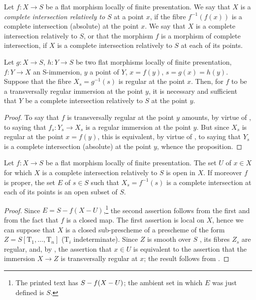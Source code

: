 \begin{definition}[19.3.6]
\label{IV.19.3.6}
Let $f:X\to S$ be a \textup{flat} morphism locally of finite presentation.
We say that $X$ is a \emph{complete intersection relatively to $S$} at a point $x$, if the fibre $f^{-1}(f(x))$ is a complete intersection (absolute) at the point $x$.
We say that $X$ is a complete intersection relatively to $S$, or that the morphism $f$ is a morphism of complete intersection, if $X$ is a complete intersection relatively to $S$ at each of its points.
\end{definition}

\begin{proposition}[19.3.7]
\label{IV.19.3.7}
Let $g:X\to S$, $h:Y\to S$ be two flat morphisms locally of finite presentation, $f:Y\to X$ an S-immersion, $y$ a point of $Y$, $x=f(y)$, $s=g(x)=h(y)$.
Suppose that the fibre $X_s=g^{-1}(s)$ is regular at the point $x$.
Then, for $f$ to be a transversally regular immersion at the point $y$, it is necessary and sufficient that $Y$ be a complete intersection relatively to $S$ at the point $y$.
\end{proposition}

\begin{proof}
To say that $f$ is transversally regular at the point $y$ amounts, by virtue of , to saying that $f_s:Y_s\to X_s$ is a regular immersion at the point $y$.
But since $X_s$ is regular at the point $x=f(y)$, this is equivalent, by virtue of , to saying that $Y_s$ is a complete intersection (absolute) at the point $y$, whence the proposition.
\end{proof}

\begin{corollary}[19.3.8]
\label{IV.19.3.8}
Let $f:X\to S$ be a flat morphism locally of finite presentation.
The set $U$ of $x\in X$ for which $X$ is a complete intersection relatively to $S$ is open in $X$.
If moreover $f$ is proper, the set $E$ of $s\in S$ such that $X_s=f^{-1}(s)$ is a complete intersection at each of its points is an open subset of $S$.
\end{corollary}

\begin{proof}
Since $E=S-f(X-U)$,\footnote{The printed text has $S- f(X- U)$; the ambient set in which $E$ was just defined is $S$.} the second assertion follows from the first and from the fact that $f$ is a closed map.
The first assertion is local on $X$, hence we can suppose that $X$ is a closed sub-prescheme of a prescheme of the form $Z=S[\mathrm{T}_1,\ldots,\mathrm{T}_n]$ ($\mathrm{T}_i$ indeterminate).
Since $Z$ is smooth over $S$ , its fibres $Z_s$ are regular, and, by , the assertion that $x\in U$ is equivalent to the assertion that the immersion $X\to Z$ is transversally regular at $x$; the result follows from .
\end{proof}

